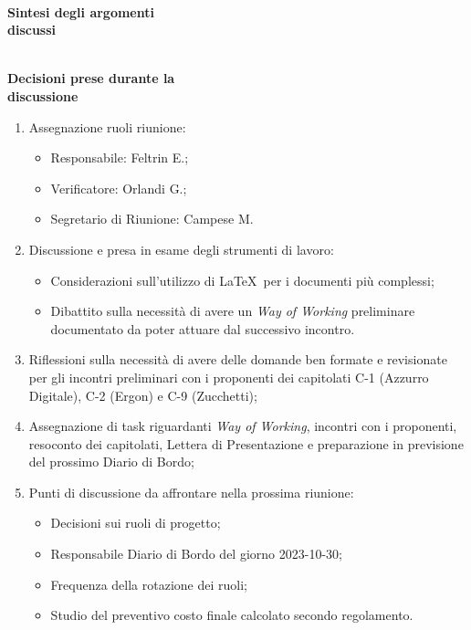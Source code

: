 \documentclass{article}
\begin{document}
\begin{paracol}{2}
\begin{enumerate}
\end{enumerate}

\newpage

\switchcolumn
\newpage

\\
\textbf{Sintesi degli argomenti\\discussi}

\vspace{15,2cm}

\\
\textbf{Decisioni prese durante la\\discussione}

\switchcolumn
\begin{enumerate}
    \item Assegnazione ruoli riunione:
    \begin{itemize}
        \item Responsabile: Feltrin E.;
        \item Verificatore: Orlandi G.;
        \item Segretario di Riunione: Campese M.
        
    \end{itemize}
    
   
    
    \item Discussione e presa in esame degli strumenti di lavoro:
    \begin{itemize}
    \item Considerazioni sull’utilizzo di \LaTeX\ per i documenti più complessi;
     \item Dibattito sulla necessità di avere un \textit{Way of Working} preliminare documentato da poter attuare dal successivo incontro.
    \end{itemize}
    \item Riflessioni sulla necessità di avere delle domande ben formate e revisionate per gli incontri preliminari con i proponenti dei capitolati C-1 (Azzurro Digitale), C-2 (Ergon) e C-9 (Zucchetti);
     \item 
     Assegnazione di task riguardanti \textit{Way of Working}, incontri con i proponenti, resoconto dei capitolati, Lettera di Presentazione e preparazione in previsione del prossimo Diario di Bordo;\\
\item Punti di discussione da affrontare nella prossima riunione:
\begin{itemize}
    \item Decisioni sui ruoli di progetto;
    \item Responsabile Diario di Bordo del giorno 2023-10-30;
    \item Frequenza della rotazione dei ruoli;
    \item Studio del preventivo costo finale calcolato secondo regolamento.
    

\end{itemize}
\end{enumerate}
\end{paracol}
\end{document}
